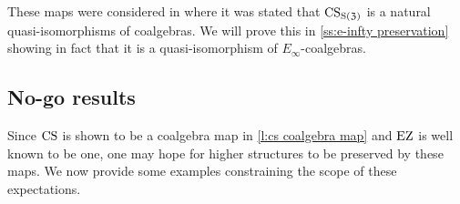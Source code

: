 These maps were considered in \cite[p. 442]{serre1951homologie} where it was stated that $\operatorname{CS}_{\operatorname{S}(\mathfrak{Z})}$ is a natural quasi-isomorphisms of coalgebras.
We will prove this in \cref{ss:e-infty preservation} showing in fact that it is a quasi-isomorphism of $E_\infty$-coalgebras.


\subsection{No-go results}

Since $\operatorname{CS}$ is shown to be a coalgebra map in \cref{l:cs coalgebra map} and $\operatorname{EZ}$ is well known to be one, one may hope for higher structures to be preserved by these maps.
We now provide some examples constraining the scope of these expectations.

